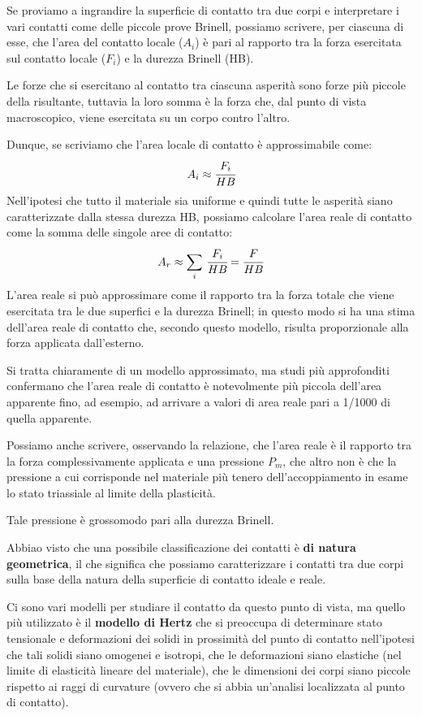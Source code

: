 Se proviamo a ingrandire la superficie di contatto tra due corpi e interpretare i vari contatti come delle piccole prove Brinell, possiamo scrivere, per ciascuna di esse, che l'area del contatto locale ($A_i$) è pari al rapporto tra la forza esercitata sul contatto locale ($F_i$) e la durezza Brinell (HB).

Le forze che si esercitano al contatto tra ciascuna asperità sono forze più piccole della risultante, tuttavia la loro somma è la forza che, dal punto di vista macroscopico, viene esercitata su un corpo contro l'altro.

Dunque, se scriviamo che l'area locale di contatto è approssimabile come:
\[A_i \approx \cfrac{F_i}{HB}\]
Nell'ipotesi che tutto il materiale sia uniforme e quindi tutte le asperità siano caratterizzate dalla stessa durezza HB, possiamo calcolare l'area reale di contatto come la somma delle singole aree di contatto:
\[A_r \approx \sum_i\,\cfrac{F_i}{HB} = \cfrac{F}{HB}\]
L'area reale si può approssimare come il rapporto tra la forza totale che viene esercitata tra le due superfici e la durezza Brinell; in questo modo si ha una stima dell'area reale di contatto che, secondo questo modello, risulta proporzionale alla forza applicata dall'esterno.

Si tratta chiaramente di un modello approssimato, ma studi più approfonditi confermano che l'area reale di contatto è notevolmente più piccola dell'area apparente fino, ad esempio, ad arrivare a valori di area reale pari a 1/1000 di quella apparente.

Possiamo anche scrivere, osservando la relazione, che l'area reale è il rapporto tra la forza complessivamente applicata e una pressione $P_m$, che altro non è che la pressione a cui corrisponde nel materiale più tenero dell'accoppiamento in esame lo stato triassiale al limite della plasticità.

Tale pressione è grossomodo pari alla durezza Brinell.\newline

Abbiao visto che una possibile classificazione dei contatti è \textbf{di natura geometrica}, il che significa che possiamo caratterizzare i contatti tra due corpi sulla base della natura della superficie di contatto ideale e reale.

Ci sono vari modelli per studiare il contatto da questo punto di vista, ma quello più utilizzato è il \textbf{modello di Hertz} che si preoccupa di determinare stato tensionale e deformazioni dei solidi in prossimità del punto di contatto nell'ipotesi che tali solidi siano omogenei e isotropi, che le deformazioni siano elastiche (nel limite di elasticità lineare del materiale), che le dimensioni dei corpi siano piccole rispetto ai raggi di curvature (ovvero che si abbia un'analisi localizzata al punto di contatto).

